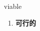 
\begin{frame}
{\huge viable}
\begin{center}
\begin{enumerate}\Large
  \item \textbf{可行的}
\end{enumerate}
\end{center}
\end{frame}
